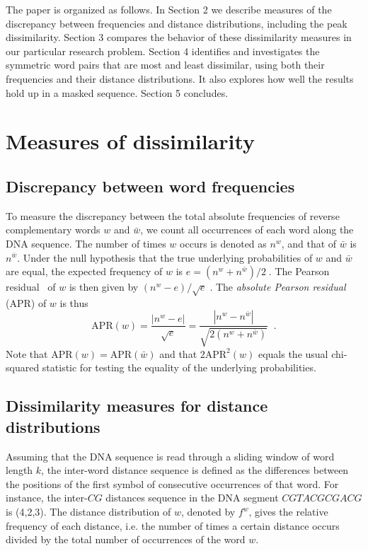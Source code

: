 \documentclass[review,12pt]{elsarticle}
\begin{document}
The paper is organized as follows. In Section
2 we describe measures of the discrepancy
between frequencies and distance distributions,
including the peak dissimilarity. Section 3
compares the behavior of these dissimilarity
measures in our particular research problem.
Section 4 identifies and investigates the
symmetric word pairs that are most and least
dissimilar, using both their frequencies and
their distance distributions. It also explores how
well the results hold up in a masked sequence.
Section 5 concludes.


\section{Measures of dissimilarity}
\subsection{Discrepancy between word frequencies}
To measure the discrepancy between the total
absolute frequencies of reverse complementary
words $w$ and $\bar{w}$, we count all
occurrences of each word along the DNA sequence.
The number of times $w$ occurs is denoted as
$n^w$, and that of $\bar{w}$ is $n^{\bar{w}}$.
Under the null hypothesis that the true
underlying probabilities of $w$ and $\bar{w}$
are equal, the expected frequency of $w$ is
$e = (n^w+n^{\bar{w}})/2\;$.
The Pearson residual~\cite{agresti2007} of $w$ is then given by
$(n^w - e)/\sqrt{e}\;$. The {\it absolute
Pearson residual} (APR) of $w$ is thus
%
\begin{equation}
\mbox{APR}(w)= \frac{|n^w - e|}{\sqrt{e}}
 = \frac{|n^w-n^{\bar{w}}|}
         {\sqrt{2(n^w+n^{\bar{w}})}} \;\;.
\end{equation}
Note that $\mbox{APR}(w)=\mbox{APR}(\bar{w})$
and that $2 \mbox{APR}^2(w)$ equals the usual
chi-squared statistic for testing the equality
of the underlying probabilities.

\subsection{Dissimilarity measures for distance
            distributions}
Assuming that the DNA sequence is read through
a sliding window of word length $k$, the
inter-word distance sequence is defined as the differences between
the positions of the first symbol of consecutive
occurrences of that word.
For instance, the inter-$CG$ distances sequence in the
DNA segment $CGTACGCGACG$ is (4,2,3).
The distance distribution of $w$, denoted by $f^w$, gives
the relative frequency of each distance, i.e. the number
of times a certain distance occurs divided by the total
number of occurrences of the word $w$.
\end{document}
